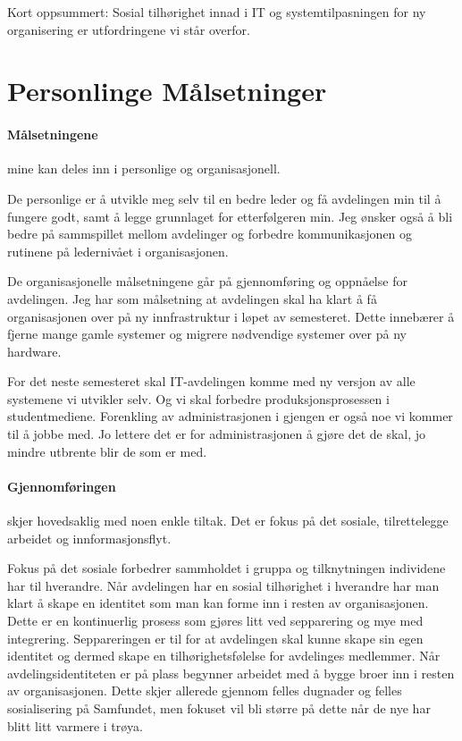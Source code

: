\documentclass[12pt, a4paper]{article}
\begin{document}
Kort oppsummert: Sosial tilhørighet innad i IT og systemtilpasningen for ny organisering er utfordringene vi står overfor. 

\section{Personlinge Målsetninger}
\paragraph{Målsetningene} mine kan deles inn i personlige og organisasjonell. 

De personlige er å utvikle meg selv til en bedre leder og få avdelingen min til å fungere godt, samt å legge grunnlaget for etterfølgeren min. Jeg ønsker også å bli bedre på sammspillet mellom avdelinger og forbedre kommunikasjonen og rutinene på ledernivået i organisasjonen.

De organisasjonelle målsetningene går på gjennomføring og oppnåelse for avdelingen. Jeg har som målsetning at avdelingen skal ha klart å få organisasjonen over på ny innfrastruktur i løpet av semesteret. Dette innebærer å fjerne mange gamle systemer og migrere nødvendige systemer over på ny hardware. 

For det neste semesteret skal IT-avdelingen komme med ny versjon av alle systemene vi utvikler selv. Og vi skal forbedre produksjonsprosessen i studentmediene. Forenkling av administrasjonen i gjengen er også noe vi kommer til å jobbe med. Jo lettere det er for administrasjonen å gjøre det de skal, jo mindre utbrente blir de som er med. 

\paragraph{Gjennomføringen} skjer hovedsaklig med noen enkle tiltak. Det er fokus på det sosiale, tilrettelegge arbeidet og innformasjonsflyt. 

Fokus på det sosiale forbedrer sammholdet i gruppa og tilknytningen individene har til hverandre. Når avdelingen har en sosial tilhørighet i hverandre har man klart å skape en identitet som man kan forme inn i resten av organisasjonen. Dette er en kontinuerlig prosess som gjøres litt ved sepparering og mye med integrering. Seppareringen er til for at avdelingen skal kunne skape sin egen identitet og dermed skape en tilhørighetsfølelse for avdelinges medlemmer.
Når avdelingsidentiteten er på plass begynner arbeidet med å bygge broer inn i resten av organisasjonen. Dette skjer allerede gjennom felles dugnader og felles sosialisering på Samfundet, men fokuset vil bli større på dette når de nye har blitt litt varmere i trøya.
\end{document}
